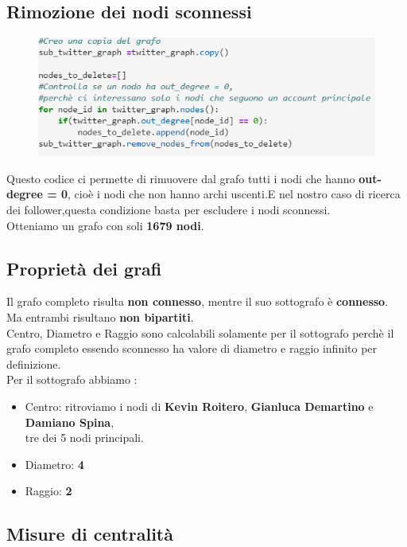 \documentclass[a4paper,11pt]{report}
\begin{document}
\subsection{Rimozione dei nodi sconnessi}
\begin{figure}[h]
	\centering
	\includegraphics[width=0.6\linewidth]{rimozione_nodi_sconnessi}
	\label{fig:rimozionenodisconnessi}
\end{figure}
Questo codice ci permette di rimuovere dal grafo tutti i nodi che hanno \textbf{out-degree = 0}, cioè i nodi che non hanno archi uscenti.E nel nostro caso di ricerca dei follower,questa condizione basta per escludere i nodi sconnessi.\\
Otteniamo un grafo con soli \textbf{1679 nodi}.

\subsection{Proprietà dei grafi}
Il grafo completo risulta \textbf{non connesso}, mentre il suo sottografo è \textbf{connesso}.\\
Ma entrambi risultano \textbf{non bipartiti}.\\
Centro, Diametro e Raggio sono calcolabili solamente per il sottografo perchè il grafo completo essendo sconnesso ha valore di diametro e raggio infinito per definizione.\\
Per il sottografo abbiamo :
		\begin{itemize}
			\item Centro: ritroviamo i nodi di \textbf{Kevin Roitero}, \textbf{Gianluca Demartino} e \textbf{Damiano Spina},\\ tre dei 5 nodi principali.
			\item Diametro:  \textbf{4}
			\item Raggio: \textbf{2}
		\end{itemize}
\subsection{Misure di centralità}
\end{document}
